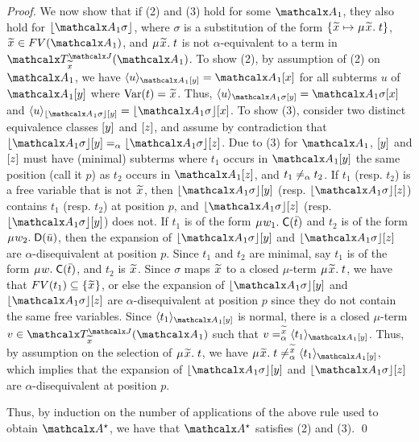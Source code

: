 \begin{rep}
\begin{proof}
We now show that if (2) and (3) hold for some $\Val_1$,
they also hold for $\nf{\Val_1 \sigma}$,
where $\sigma$ is a substitution of the form $\{ {\Varec{x}} \mapsto \MU{\Varec{x}}.\; t \}$,
${\Varec{x}} \in FV( \Val_1 )$,
and $\MU {\Varec{x}}.\; t$ is not $\alpha$-equivalent to a term in $\Terms^{\smash{\J}}_{\Varec{x}}(\Val_1)$.
To show (2),
by assumption of (2) on $\Val_1$, we have $\expand{\Val_1 \ec{y}}{ u } = \Val_1 \ec{x}$ for
all subterms $u$ of $\Val_1 \ec{y}$ where $\muvar(t) = {\Varec{x}}$.
Thus, $\expand{\Val_1 \sigma \ec{y}}{ u } = \Val_1 \sigma \ec{x}$ and
$\expand{\nf{\Val_1 \sigma} \ec{y}}{ u } = \nf{\Val_1 \sigma} \ec{x}$.
To show (3),
consider two distinct equivalence classes $[y]$ and $[z]$,
and assume by contradiction that $\nf{\Val_1 \sigma} \ec{y} \aequiv \nf{\Val_1 \sigma} \ec{z}$.
Due to (3) for $\Val_1$,
$[y]$ and $[z]$ must have (minimal) subterms
where $t_1$ occurs in $\Val_1 \ec{y}$ the same position (call it $p$) as $t_2$ occurs in $\Val_1 \ec{z}$,
and $t_1 \not\mathrel{=_\alpha} t_2$.
If $t_1$ (resp. $t_2$) is a free variable that is not ${\Varec{x}}$,
then $\nf{\Val_1 \sigma} \ec{y}$ (resp. $\nf{\Val_1 \sigma} \ec{z}$)
contains $t_1$ (resp. $t_2$) at position $p$,
and $\nf{\Val_1 \sigma} \ec{z}$ (resp. $\nf{\Val_1 \sigma} \ec{y}$) does not.
If $t_1$ is of the form $\MU w_1.\; \const{C}( \vec t )$
and $t_2$ is of the form $\MU w_2.\; \const{D}( \vec u )$,
then the expansion %
of $\nf{\Val_1 \sigma} \ec{y}$ and $\nf{\Val_1 \sigma} \ec{z}$
are $\alpha$-disequivalent at position $p$.
Since $t_1$ and $t_2$ are minimal,
say $t_1$ is of the form $\MU w.\; \const{C}( \vec t )$,
and $t_2$ is ${\Varec{x}}$.
Since $\sigma$ maps ${\Varec{x}}$ to a closed $\mu$-term $\MU {\Varec{x}}.\; t$,
we have that $FV( t_1 ) \subseteq \{ {\Varec{x}} \}$,
or else the expansion of $\nf{\Val_1 \sigma} \ec{y}$ and $\nf{\Val_1 \sigma} \ec{z}$
are $\alpha$-disequivalent at position $p$ since they do not contain the same free variables.
Since $\expand{\Val_1 \ec{y}}{t_1}$ is normal,
there is a closed $\mu$-term $v \in \Terms^{\smash{\J}}_{\Varec{x}}( \Val_1 )$
such that $v \vsimv{\Varec{x}} \expand{\Val_1 \ec{y}}{t_1}$.
Thus, by assumption on the selection of $\MU {\Varec{x}}.\; t$,
we have $\MU {\Varec{x}}.\; t \not\vsimv{\Varec{x}} \expand{\Val_1 \ec{y}}{t_1}$,
which implies that the expansion of $\nf{\Val_1 \sigma} \ec{y}$ and $\nf{\Val_1 \sigma} \ec{z}$
are $\alpha$-disequivalent at position $p$. %

Thus, by induction on the number of applications of the above rule used to obtain $\ValC$,
we have that $\ValC$ satisfies (2) and (3).
\qed
\end{proof}
\end{rep}

